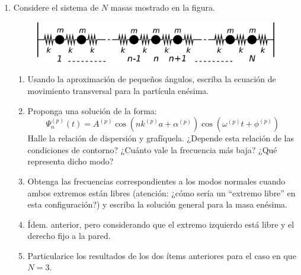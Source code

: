 \documentclass[11pt,spanish,a4paper]{article}
\begin{document}
\begin{enumerate}
\item Considere el sistema de $N$ masas mostrado en la figura. 
\begin{figure}[H]
\begin{centering}
\includegraphics[clip,scale=0.25]{ej1-11}
\par\end{centering}

\end{figure}


\begin{enumerate}
\item Usando la aproximación de pequeños ángulos, escriba la ecuación de
movimiento transversal para la partícula enésima. 
\item Proponga una solución de la forma:
\[
\Psi_{n}^{(p)}(t)=A^{(p)}\cos\left(nk^{(p)}a+\alpha^{(p)}\right)\cos\left(\omega^{(p)}t+\phi^{(p)}\right)
\]
Halle la relación de dispersión y grafíquela. ¿Depende esta relación
de las condiciones de contorno? ¿Cuánto vale la frecuencia más baja?
¿Qué representa dicho modo? 
\item Obtenga las frecuencias correspondientes a los modos normales cuando
ambos extremos están libres (atención: ¿cómo sería un ``extremo libre''
en esta configuración?) y escriba la solución general para la masa
enésima. 
\item Ídem. anterior, pero considerando que el extremo izquierdo está libre
y el derecho fijo a la pared. 
\item Particularice los resultados de los dos ítems anteriores para el caso
en que $N=3$.
\end{enumerate}




\end{enumerate}
\end{document}
